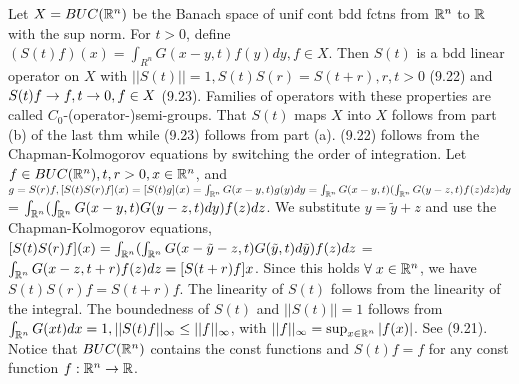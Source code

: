 Let $X = BUC(\mathbb{R}^n)$ be the Banach space of unif cont bdd fctns from $\mathbb{R}^n$ to $\mathbb{R}$ with the sup norm.  For $t>0$, define $(S(t)f)(x) = \int_{R^n} G(x-y,t)f(y)dy, f \in X$. Then $S(t)$ is a bdd linear operator on $X$ with $||S(t)||=1, S(t)S(r) = S(t+r), r,t > 0$ (9.22) and $S(t)f \rightarrow f, t \rightarrow 0, f \in X$ (9.23). Families of operators with these properties are called $C_0$-(operator-)semi-groups. That $S(t)$ maps $X$ into $X$ follows from part (b) of the last thm while (9.23) follows from part (a). (9.22) follows from the Chapman-Kolmogorov equations by switching the order of integration.  Let $f \in BUC(\mathbb{R}^n), t,r > 0, x \in \mathbb{R}^n$, and $g=S(r)f, [S(t)S(r)f](x) = [S(t)g](x) = \int_{\mathbb{R}^n}G(x-y,t) g(y)dy = \int_{\mathbb{R}^n}G(x-y,t) (\int_{\mathbb{R}^n}G(y-z,t) f(z)dz)dy$ = $ \int_{\mathbb{R}^n}(\int_{\mathbb{R}^n}G(x-y,t) G(y-z,t) dy) f(z)dz$. We substitute $y = \tilde y + z$ and use the Chapman-Kolmogorov equations, $[S(t)S(r)f](x) =\int_{\mathbb{R}^n}(\int_{\mathbb{R}^n} G(x-\tilde{y}-z,t) G(\tilde{y},t) d\tilde{y}) f(z)dz$  = $\int_{\mathbb{R}^n} G(x-z,t+r) f(z)dz = [S(t+r)f]{x}$. Since this holds $\forall \; x \in \mathbb{R}^n$, we have $S(t)S(r)f = S(t+r)f$. The linearity of $S(t)$ follows from the linearity of the integral.  The boundedness of $S(t)$ and $||S(t)|| = 1$ follows from $\int_{\mathbb{R}^n} G(xt)dx = 1, ||S(t)f||_{\infty} \leq ||f||_{\infty}$, with $||f||_{\infty} = \sup_{x \in \mathbb{R}^n} |f(x)|$. See (9.21). Notice that $BUC(\mathbb{R}^n)$ contains the const functions and $S(t)f = f$ for any const function $f: \mathbb{R}^n \rightarrow \mathbb{R}$. 